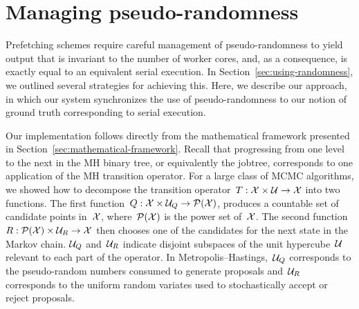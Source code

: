 \documentclass[angelino.tex]{subfiles}
\begin{document}
\section{Managing pseudo-randomness}
\label{sec:handling-randomness}

Prefetching schemes require careful management of pseudo-randomness to yield
output that is invariant to the number of worker cores, and, as a consequence, 
is exactly equal to an equivalent serial execution.
%
In Section~\ref{sec:using-randomness}, we outlined several strategies for
achieving this.
%
Here, we describe our approach, in which our system synchronizes the use of
pseudo-randomness to our notion of ground truth corresponding to serial execution.

Our implementation follows directly from the mathematical framework
presented in Section~\ref{sec:mathematical-framework}.
%
Recall that progressing from one level to the next in the MH binary tree,
or equivalently the jobtree, corresponds to one application of the MH transition 
operator.
%
For a large class of MCMC algorithms, we showed how to decompose the
transition operator~${T:{\mathcal X}\times\mathcal{U}\to{\mathcal X}}$ into two functions.
%
The first function~${Q:{\mathcal X}\times\mathcal{U}_Q\to\mathcal{P}({\mathcal X})}$, produces a countable set of
candidate points in~${\mathcal X}$, where~$\mathcal{P}({\mathcal X})$ is the power set of~${\mathcal X}$.
%
The second function~${R:\mathcal{P}({\mathcal X})\times\mathcal{U}_R\to{\mathcal X}}$ then chooses one of the 
candidates for the next state in the Markov chain.
%
$\mathcal{U}_Q$ and~$\mathcal{U}_R$ indicate disjoint subspaces of the unit hypercube~$\mathcal{U}$
relevant to each part of the operator.
%
%
In Metropolis--Hastings,~$\mathcal{U}_Q$ corresponds to the pseudo-random numbers 
consumed to generate proposals and~$\mathcal{U}_R$ corresponds to the uniform random
variates used to stochastically accept or reject proposals.
\end{document}
